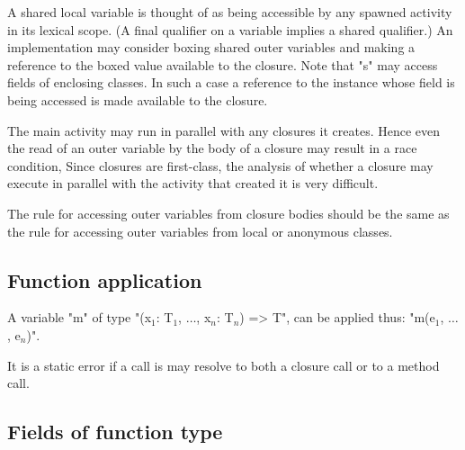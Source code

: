 A shared local variable is thought of as being accessible by any spawned
activity in its lexical scope. (A final qualifier on a variable implies
a shared qualifier.) An implementation may consider boxing shared outer
variables and making a reference to the boxed value available to the
closure. Note that \xcd"s" may access fields of enclosing classes. In such a
case a reference to the instance whose field is being accessed is made
available to the closure.

\begin{note}
The main activity may run in parallel with any
closures it creates. Hence even the read of an outer variable by the
body of a closure may result in a race condition, Since closures are
first-class, the analysis of whether a closure may execute in parallel
with the activity that created it is very difficult.
\end{note}

\begin{note}
The rule for accessing outer variables from closure bodies
should be the same as the rule for accessing outer variables from local
or anonymous classes.
\end{note}

\subsection{Function application}

A variable \xcd"m" of type
\xcdmath"(x$_1$: T$_1$, $\dots$, x$_n$: T$_n$) => T",
can be applied thus:
\xcdmath"m(e$_1$, $\dots$, e$_n$)".

It is a static error if a call is may resolve to both a closure call or
to a method call.


\subsection{Fields of function type}

